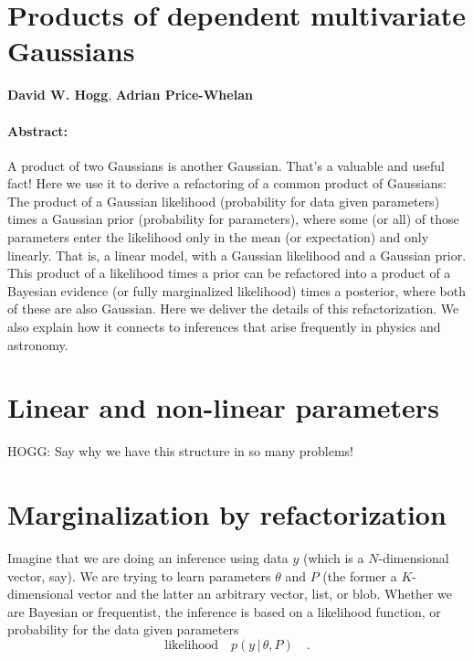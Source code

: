 \documentclass[12pt, letterpaper]{article}
\newcommand{\given}{\,|\,}
\begin{document}
\section*{Products of dependent multivariate Gaussians}

\noindent
\textbf{David W. Hogg}, \textbf{Adrian Price-Whelan}

\paragraph{Abstract:}
A product of two Gaussians is another Gaussian.
That's a valuable and useful fact!
Here we use it to derive a refactoring of a common product of
Gaussians:
The product of a Gaussian likelihood (probability for data given
parameters) times a Gaussian prior (probability for parameters),
where some (or all) of those parameters enter the likelihood
only in the mean (or expectation) and only linearly.
That is, a linear model, with a Gaussian likelihood and a Gaussian
prior.
This product of a likelihood times a prior can be refactored into a
product of a Bayesian evidence (or fully marginalized likelihood)
times a posterior, where both of these are also Gaussian.
Here we deliver the details of this refactorization.
We also explain how it connects to inferences that arise frequently in
physics and astronomy.

\section{Linear and non-linear parameters}

HOGG: Say why we have this structure in so many problems!

\section{Marginalization by refactorization}

Imagine that we are doing an inference using data $y$ (which is a
$N$-dimensional vector, say).
We are trying to learn parameters $\theta$ and $P$ (the former a
$K$-dimensional vector and the latter an arbitrary vector, list,
or blob.
Whether we are Bayesian or frequentist, the inference is based on
a likelihood function, or probability for the data given parameters
\begin{equation}
\mbox{likelihood} \quad p(y\given\theta,P)
\quad .
\end{equation}
\end{document}
